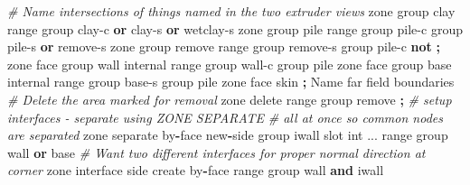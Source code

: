 \documentclass[a4paper, nobind]{templates/ociamthesis}
\newenvironment{Shaded}{\begin{snugshade}}{\end{snugshade}}
\newcommand{\BuiltInTok}[1]{#1}
\newcommand{\CommentTok}[1]{\textcolor[rgb]{0.56,0.35,0.01}{\textit{#1}}}
\newcommand{\KeywordTok}[1]{\textcolor[rgb]{0.13,0.29,0.53}{\textbf{#1}}}
\newcommand{\NormalTok}[1]{#1}
\newcommand{\OperatorTok}[1]{\textcolor[rgb]{0.81,0.36,0.00}{\textbf{#1}}}
\newcommand{\StringTok}[1]{\textcolor[rgb]{0.31,0.60,0.02}{#1}}
\renewenvironment{Shaded}
{
  \vspace{10pt}%
  \begin{snugshade}%
}{%
  \end{snugshade}%
  \vspace{8pt}%
}
\begin{document}
\begin{Shaded}
\begin{Highlighting}[]
\CommentTok{\# Name intersections of things named in the two extruder views}
\NormalTok{zone group }\StringTok{\textquotesingle{}clay\textquotesingle{}} \BuiltInTok{range}\NormalTok{ group }\StringTok{\textquotesingle{}clay{-}c\textquotesingle{}} \KeywordTok{or} \StringTok{\textquotesingle{}clay{-}s\textquotesingle{}} \KeywordTok{or} \StringTok{\textquotesingle{}wetclay{-}s\textquotesingle{}}
\NormalTok{zone group }\StringTok{\textquotesingle{}pile\textquotesingle{}} \BuiltInTok{range}\NormalTok{ group }\StringTok{\textquotesingle{}pile{-}c\textquotesingle{}}\NormalTok{ group }\StringTok{\textquotesingle{}pile{-}s\textquotesingle{}} \KeywordTok{or} \StringTok{\textquotesingle{}remove{-}s\textquotesingle{}}
\NormalTok{zone group }\StringTok{\textquotesingle{}remove\textquotesingle{}} \BuiltInTok{range}\NormalTok{ group }\StringTok{\textquotesingle{}remove{-}s\textquotesingle{}}\NormalTok{ group }\StringTok{\textquotesingle{}pile{-}c\textquotesingle{}} \KeywordTok{not} \OperatorTok{;} 
\NormalTok{zone face group }\StringTok{\textquotesingle{}wall\textquotesingle{}}\NormalTok{ internal }\BuiltInTok{range}\NormalTok{ group }\StringTok{\textquotesingle{}wall{-}c\textquotesingle{}}\NormalTok{ group }\StringTok{\textquotesingle{}pile\textquotesingle{}}
\NormalTok{zone face group }\StringTok{\textquotesingle{}base\textquotesingle{}}\NormalTok{ internal }\BuiltInTok{range}\NormalTok{ group }\StringTok{\textquotesingle{}base{-}s\textquotesingle{}}\NormalTok{ group }\StringTok{\textquotesingle{}pile\textquotesingle{}}
\NormalTok{zone face skin }\OperatorTok{;}\NormalTok{ Name far field boundaries}
\CommentTok{\# Delete the area marked for removal}
\NormalTok{zone delete }\BuiltInTok{range}\NormalTok{ group }\StringTok{\textquotesingle{}remove\textquotesingle{}}
\OperatorTok{;}
\CommentTok{\# setup interfaces {-} separate using ZONE SEPARATE }
\CommentTok{\# all at once so common nodes are separated}
\NormalTok{zone separate by}\OperatorTok{{-}}\NormalTok{face new}\OperatorTok{{-}}\NormalTok{side group }\StringTok{\textquotesingle{}iwall\textquotesingle{}}\NormalTok{ slot }\StringTok{\textquotesingle{}int\textquotesingle{}}\NormalTok{ ...}
     \BuiltInTok{range}\NormalTok{ group }\StringTok{\textquotesingle{}wall\textquotesingle{}} \KeywordTok{or} \StringTok{\textquotesingle{}base\textquotesingle{}}
\CommentTok{\# Want two different interfaces for proper normal direction at corner}
\NormalTok{zone interface }\StringTok{\textquotesingle{}side\textquotesingle{}}\NormalTok{ create by}\OperatorTok{{-}}\NormalTok{face }\BuiltInTok{range}\NormalTok{ group }\StringTok{\textquotesingle{}wall\textquotesingle{}} \KeywordTok{and} \StringTok{\textquotesingle{}iwall\textquotesingle{}}

\end{Highlighting}
\end{Shaded}
\end{document}
